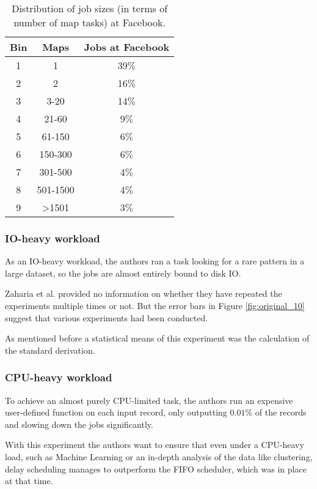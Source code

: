 \begin{table}
\centering
\caption{Distribution of job sizes (in terms of number of map tasks) at Facebook.}\label{tab2}
\begin{tabular}{|c|c|c|}
\hline
\textbf{Bin} & \textbf{Maps} & \textbf{Jobs at Facebook} \\ \hline
1  & 1 & 39$\%$       \\ \hline
2  & 2 & 16$\%$       \\ \hline
3  & 3-20 & 14$\%$       \\ \hline
4  & 21-60 & 9$\%$       \\ \hline
5  & 61-150 & 6$\%$       \\ \hline
6  & 150-300 & 6$\%$       \\ \hline
7  & 301-500 & 4$\%$       \\ \hline
8  & 501-1500 & 4$\%$       \\ \hline
9  & >1501 & 3$\%$       \\ \hline
\end{tabular}
\end{table}

\subsubsection{IO-heavy workload}

As an IO-heavy workload, the authors ran a task looking for a rare pattern in a large dataset, so the jobs are almost entirely bound to disk IO.

Zaharia et al. provided no information on whether they have repeated the experiments multiple times or not. But the error bars in Figure \ref{fig:original_10} suggest that various experiments had been conducted.

As mentioned before a statistical means of this experiment was the calculation of the standard derivation.

\subsubsection{CPU-heavy workload}

To achieve an almost purely CPU-limited task, the authors run an expensive user-defined function on each input record, only outputting $0.01\%$ of the records and slowing down the jobs significantly.

With this experiment the authors want to ensure that even under a CPU-heavy load, such as Machine Learning or an in-depth analysis of the data like clustering, delay scheduling manages to outperform the FIFO scheduler, which was in place at that time.

